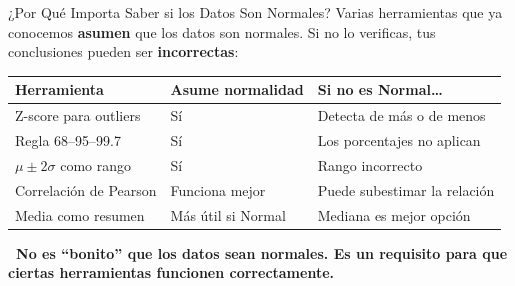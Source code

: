 \documentclass[aspectratio=169, 11pt]{beamer}
\begin{document}
\begin{frame}[shrink=10]{¿Por Qué Importa Saber si los Datos Son Normales?}
  \vspace{-4pt}
  {\footnotesize
    Varias herramientas que ya conocemos \textbf{asumen} que los datos son normales.
    Si no lo verificas, tus conclusiones pueden ser \textbf{incorrectas}:}

  \vspace{6pt}
  {\small
  \renewcommand{\arraystretch}{1.3}
  \begin{tabular}{@{}p{4.2cm}p{3.5cm}p{4.2cm}@{}}
    \toprule
    \textbf{Herramienta} & \textbf{Asume normalidad} & \textbf{Si no es Normal\ldots} \\
    \midrule
    Z-score para outliers &
      Sí &
      Detecta de más o de menos \\
    Regla 68--95--99.7 &
      Sí &
      Los porcentajes no aplican \\
    $\mu \pm 2\sigma$ como rango &
      Sí &
      Rango incorrecto \\
    Correlación de Pearson &
      Funciona mejor &
      Puede subestimar la relación \\
    Media como resumen &
      Más útil si Normal &
      Mediana es mejor opción \\
    \bottomrule
  \end{tabular}
  }

  \vspace{6pt}
  {\scriptsize\color{arcaDark}\bfseries
    \faExclamationTriangle\ No es ``bonito'' que los datos sean normales.
    Es un \textbf{requisito} para que ciertas herramientas funcionen correctamente.}
\end{frame}
\end{document}
